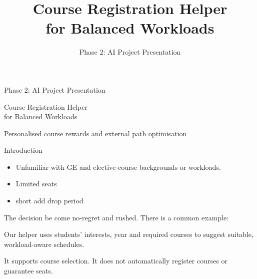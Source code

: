 \documentclass[aspectratio=169,11pt]{beamer}
\title{Course Registration Helper\\for Balanced Workloads}
\subtitle{Phase 2: AI Project Presentation}
\author{}
\date{}
\newcommand{\smallnote}[1]{\par{\footnotesize\color{muted}#1\par}}
\begin{document}
\begin{frame}[plain]
\vspace{10mm}
{\color{accent}\large Phase 2: AI Project Presentation\par}
\vspace{5mm}
{Course Registration Helper\\for Balanced Workloads\par}
\vspace{7mm}
{\large Personalised course rewards and external path optimisation\par}
\end{frame}

\begin{frame}{Introduction}
\begin{itemize}\setlength{\itemsep}{7pt}
Study-path planning is an important progress in university life. due to
\item  Unfamiliar with GE and elective-course backgrounds or workloads.
\item Limited seats 
\item short add drop period 
\end{itemize}
\vspace{3mm}
The decision be come no-regret and rushed.
There is a common example:


Our helper uses students' interests, year and required courses to suggest suitable, workload-aware schedules.
\smallnote{It supports course selection. It does not automatically register courses or guarantee seats.}
\end{frame}
\end{document}
